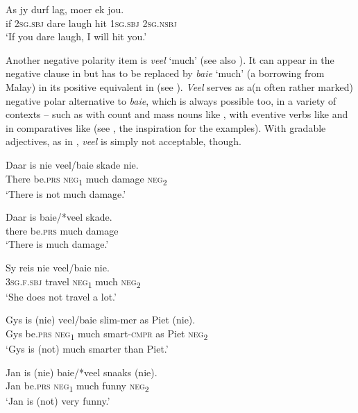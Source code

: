 \documentclass[output=paper,colorlinks,citecolor=brown]{langscibook}
\begin{document}
    \ex\label{ex:afr:39b}
        \gll As jy durf lag, moer ek jou. \\
             if \textsc{2sg.sbj} dare laugh hit \textsc{1sg.sbj} \textsc{2sg.nsbj} \\
        \glt ‘If you dare laugh, I will hit you.’
    \z
\z 

Another negative polarity item is \textit{veel} ‘much’ (see also \citealt{KotzéBreed2019}). It can appear in the negative clause in  but has to be replaced by \textit{baie} ‘much’ (a borrowing from Malay) in its positive equivalent in  (see \citealt{KotzéBreed2018}). \textit{Veel} serves as a(n often rather marked) negative polar alternative to \textit{baie}, which is always possible too, in a variety of contexts – such as with count and mass nouns like , with eventive verbs like  and in comparatives like  (see \citealt[23--24]{Berghoff2016}, the inspiration for the examples). With gradable adjectives, as in , \textit{veel} is simply not acceptable, though.

\ea\label{ex:afr:40}
    \ea\label{ex:afr:40a}
        \gll Daar is nie veel/baie skade nie. \\ 
             There be.\textsc{prs} \textsc{neg}\textsubscript{1} much damage \textsc{neg}\textsubscript{2} \\
        \glt ‘There is not much damage.’
    
    \ex\label{ex:afr:40b}
        \gll Daar is baie/*veel skade. \\
             there be.\textsc{prs} much damage \\
        \glt ‘There is much damage.’

    \ex\label{ex:afr:40c}
        \gll Sy reis nie veel/baie nie. \\ 
             \textsc{3sg.f.sbj} travel \textsc{neg}\textsubscript{1} much \textsc{neg}\textsubscript{2} \\
        \glt ‘She does not travel a lot.’
    
    \ex\label{ex:afr:40d}
        \gll Gys is (nie) veel/baie slim-mer as Piet (nie). \\
            Gys be.\textsc{prs} \textsc{neg}\textsubscript{1} much smart-\textsc{cmpr} as Piet \textsc{neg}\textsubscript{2} \\
        \glt  ‘Gys is (not) much smarter than Piet.’

    \ex\label{ex:afr:40e}
        \gll Jan is (nie) baie/*veel snaaks (nie). \\
             Jan be.\textsc{prs} \textsc{neg}\textsubscript{1} much funny \textsc{neg}\textsubscript{2}\\
        \glt ‘Jan is (not) very funny.’
    \z
\z 
\end{document}
